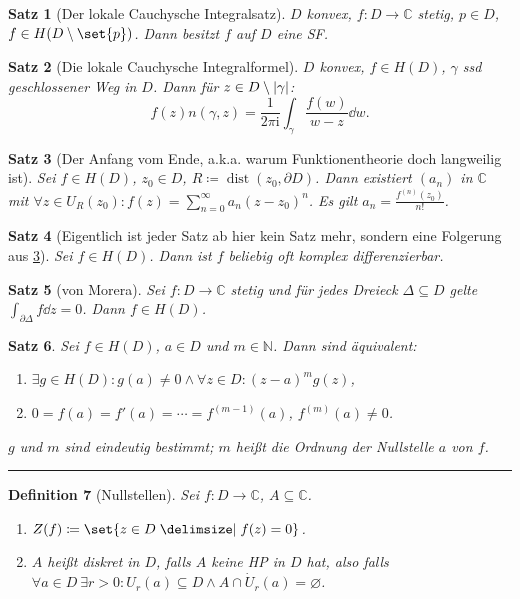 \documentclass[a4paper]{article}
\newcounter{Sec}
\theoremstyle{marginbreak}
\newtheorem{definition}{Definition}[Sec]
\newtheorem{satz}[definition]{Satz}
\newcommand{\sep}{%
	\rule{\textwidth}{0.3pt}%
	\stepcounter{Sec}%
	}
\newcommand{\C}{\mathbb{C}}
\renewcommand{\i}{\mathrm{i}}
\DeclareMathOperator{\dist}{dist}
\begin{document}
	\begin{satz}[Der lokale Cauchysche Integralsatz]
		$D$ konvex, $f\colon D\to\C$ stetig, $p\in D$, $f\in H(D\setminus\set{p})$.
		Dann besitzt $f$ auf $D$ eine SF.
	\end{satz}
	\begin{satz}[Die lokale Cauchysche Integralformel]
		$D$ konvex, $f\in H(D)$, $\gamma$ ssd geschlossener Weg in $D$. Dann für $z\in D\setminus\abs{\gamma}$:
		\[
			f(z)n(\gamma, z)=\frac{1}{2\pi\i}\int_\gamma\frac{f(w)}{w-z}\dd{w}.
		\]
	\end{satz}
	\begin{satz}[Der Anfang vom Ende, a.k.a. warum Funktionentheorie doch langweilig ist]\label{pre}
		Sei $f\in H(D)$, $z_0\in D$, $R\coloneqq\dist(z_0,\partial D)$. Dann existiert $(a_n)$ in $\C$ mit
		$\forall z\in U_R(z_0): f(z)=\sum_{n=0}^\infty a_n(z-z_0)^n$. Es gilt $a_n=\frac{f^{(n)}(z_0)}{n!}$.
	\end{satz}
	\begin{satz}[Eigentlich ist jeder Satz ab hier kein Satz mehr, sondern eine Folgerung aus \ref{pre}]
		Sei $f\in H(D)$. Dann ist $f$ beliebig oft komplex differenzierbar.
	\end{satz}
	\begin{satz}[von Morera]
		Sei $f\colon D\to\C$ stetig und für jedes Dreieck $\Delta\subseteq D$ gelte
		$\int_{\partial\Delta}f\dd{z}=0$. Dann $f\in H(D)$.
	\end{satz}
	\begin{satz}
		Sei $f\in H(D)$, $a\in D$ und $m\in\mathbb{N}$. Dann sind äquivalent:
		\begin{enumerate}[label=(\alph*)]
			\item $\exists g\in H(D): g(a)\neq 0\wedge \forall z\in D: (z-a)^mg(z)$,
			\item $0=f(a)=f'(a)=\cdots=f^{(m-1)}(a)$, $f^{(m)}(a)\neq 0$.
		\end{enumerate}
		$g$ und $m$ sind eindeutig bestimmt; $m$ heißt die Ordnung der Nullstelle $a$ von $f$.
	\end{satz}
	\sep
	\begin{definition}[Nullstellen]
		Sei $f\colon D\to\C$, $A\subseteq\C$.
		\begin{enumerate}[label=(\alph*)]
			\item $Z(f)\coloneqq\set{z\in D\given f(z)=0}$.
			\item $A$ heißt diskret in $D$, falls $A$ keine HP in $D$ hat, also falls
				$\forall a\in D~\exists r>0: U_r(a)\subseteq D\wedge A\cap \dot{U}_r(a)=\varnothing$.
		\end{enumerate}
	\end{definition}
\end{document}
